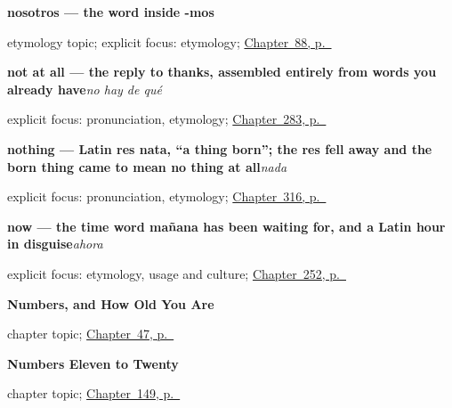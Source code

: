 \noindent\begin{minipage}[t]{\linewidth}
\raggedright
\textbf{nosotros — the word inside -mos}\par
\footnotesize etymology topic; explicit focus: etymology; \hyperref[ch:pronoun-nos]{Chapter~88, p.~\pageref*{ch:pronoun-nos}}
\end{minipage}\par\smallskip

\noindent\begin{minipage}[t]{\linewidth}
\raggedright
\textbf{not at all — the reply to thanks, assembled entirely from words you already have}\enspace\emph{no hay de qué}\par
\footnotesize explicit focus: pronunciation, etymology; \hyperref[ch:cortesia]{Chapter~283, p.~\pageref*{ch:cortesia}}
\end{minipage}\par\smallskip

\noindent\begin{minipage}[t]{\linewidth}
\raggedright
\textbf{nothing — Latin res nata, \textquotedblleft{}a thing born\textquotedblright{}; the res fell away and the born thing came to mean no thing at all}\enspace\emph{nada}\par
\footnotesize explicit focus: pronunciation, etymology; \hyperref[ch:nunca-y-siempre]{Chapter~316, p.~\pageref*{ch:nunca-y-siempre}}
\end{minipage}\par\smallskip

\noindent\begin{minipage}[t]{\linewidth}
\raggedright
\textbf{now — the time word mañana has been waiting for, and a Latin hour in disguise}\enspace\emph{ahora}\par
\footnotesize explicit focus: etymology, usage and culture; \hyperref[ch:ahora-hoy]{Chapter~252, p.~\pageref*{ch:ahora-hoy}}
\end{minipage}\par\smallskip

\noindent\begin{minipage}[t]{\linewidth}
\raggedright
\textbf{Numbers, and How Old You Are}\par
\footnotesize chapter topic; \hyperref[ch:numbers-and-age]{Chapter~47, p.~\pageref*{ch:numbers-and-age}}
\end{minipage}\par\smallskip

\noindent\begin{minipage}[t]{\linewidth}
\raggedright
\textbf{Numbers Eleven to Twenty}\par
\footnotesize chapter topic; \hyperref[ch:spanish-numbers-eleven-to-twenty]{Chapter~149, p.~\pageref*{ch:spanish-numbers-eleven-to-twenty}}
\end{minipage}\par\smallskip

